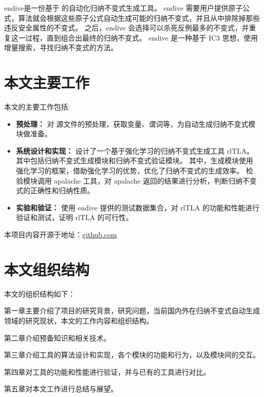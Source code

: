 endive\cite{endive}是一份基于 \TLA 的自动化归纳不变式生成工具。
endive 需要用户提供原子公式，算法就会根据这些原子公式自动生成可能的归纳不变式，并且从中排除掉那些违反安全属性的不变式。
之后，endive 会选择可以杀死反例最多的不变式，并重复这一过程，直到组合出最终的归纳不变式。
endive 是一种基于 IC3 思想，使用增量搜索，寻找归纳不变式的方法。

\section{本文主要工作}

本文的主要工作包括:
\begin{itemize}
    \item \textbf{预处理：} 对 \TLA  源文件的预处理，获取变量、谓词等，为自动生成归纳不变式模块做准备。
    \item \textbf{系统设计和实现：} 设计了一个基于强化学习的归纳不变式生成工具 rlTLA。其中包括归纳不变式生成模块和归纳不变式验证模块。
其中，生成模块使用强化学习的框架，借助强化学习的优势，优化了归纳不变式的生成效率。
检验模块调用 apalache 工具，对 apalache 返回的结果进行分析，判断归纳不变式的正确性和归纳性质。
    \item \textbf{实验和验证：} 使用 endive 提供的测试数据集合，对 rlTLA 的功能和性能进行验证和测试，证明 rlTLA 的可行性。
\end{itemize}

本项目内容开源于地址：\href{https://github.com/}{github.com}

\section{本文组织结构}
本文的组织结构如下：

第一章主要介绍了项目的研究背景，研究问题，当前国内外在归纳不变式自动生成领域的研究现状，本文的工作内容和组织结构。

第二章介绍预备知识和相关技术。

第三章介绍工具的算法设计和实现，各个模块的功能和行为，以及模块间的交互。

第四章对工具的功能和性能进行验证，并与已有的工具进行对比。

第五章对本文工作进行总结与展望。

